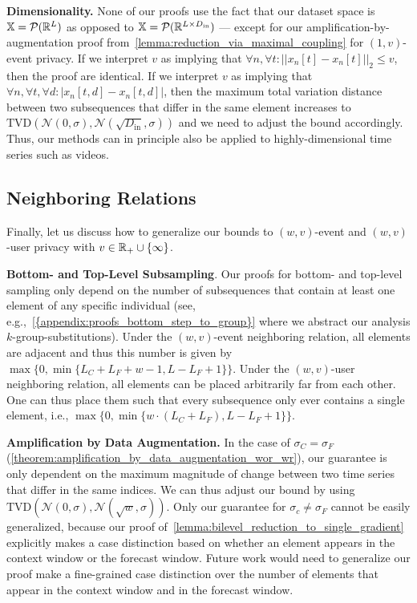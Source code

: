 \textbf{Dimensionality.}
None of our proofs use the fact that our dataset space is
${\mathbb{X}} = \mathcal{P}({\mathbb{R}}^L)$ as opposed to ${\mathbb{X}} = \mathcal{P}({\mathbb{R}}^{L \times D_\mathrm{in}})$ --- except for our amplification-by-augmentation proof from~\cref{lemma:reduction_via_maximal_coupling} for $(1,v)$-event privacy.
If we interpret $v$ as implying that $\forall n, \forall t: ||x_n[t] - x_n[t]||_2 \leq v$, then the proof are identical.
If we interpret $v$ as implying that $\forall n, \forall t, \forall d: |x_n[t, d] - x_n[t,d]|$,
then the maximum total variation distance between two subsequences that differ in the same element increases to $\mathrm{TVD}\left(\mathcal{N}(0, \sigma), \mathcal{N}(\sqrt{D_\mathrm{in}}, \sigma)\right)$ and we need to adjust the bound accordingly.
Thus, our methods can in principle also be applied to highly-dimensional time series such as videos.



\subsection{Neighboring Relations}
Finally, let us discuss how to generalize our bounds to $(w,v)$-event and $(w,v)$-user privacy with $v \in {\mathbb{R}}_+ \cup \{\infty\}$. 

\textbf{Bottom- and Top-Level Subsampling}. Our proofs for bottom- and top-level sampling  only depend on the number
of subsequences that contain at least one element of any specific individual
(see, e.g.,~\cref{{appendix:proofs_bottom_step_to_group}} where we abstract our analysis $k$-group-substitutions).
Under the $(w,v)$-event neighboring relation, all elements are adjacent and thus this number is given by $\max\{0, \min\{ L_C + L_F + w - 1, L - L_F + 1\}\}$.
Under the $(w,v)$-user neighboring relation, all elements can be placed arbitrarily far from each other. One can thus place them such that every subsequence only ever contains a single element, i.e.,
$\max\{0, \min\{ w \cdot (L_C + L_F), L - L_F + 1\}\}$.

\textbf{Amplification by Data Augmentation.}
In the case of $\sigma_C = \sigma_F$ (\cref{theorem:amplification_by_data_augmentation_wor_wr}),
our guarantee is only dependent on the maximum magnitude of change
between two time series that differ in the same indices.
We can thus adjust our bound by
using $\mathrm{TVD}\left(\mathcal{N}(0, \sigma), \mathcal{N}(\sqrt{w}, \sigma)\right)$.
Only our guarantee for $\sigma_c \neq \sigma_F$ cannot be easily generalized, because our proof of~\cref{lemma:bilevel_reduction_to_single_gradient} explicitly makes a case distinction based on whether an element appears in the context window or the forecast window.
Future work would need to generalize our proof make a fine-grained case distinction over the number of elements that appear in the context window and in the forecast window.